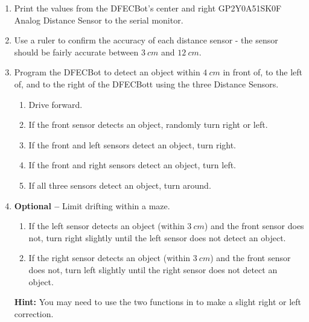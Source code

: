 \documentclass{handout}
\begin{document}
	\begin{enumerate}
		\item Print the values from the DFECBot's center and right GP2Y0A51SK0F Analog Distance Sensor to the serial monitor.
		\item Use a ruler to confirm the accuracy of each distance sensor - the sensor should be fairly accurate between $3\ cm$ and $12\ cm$.
		\item Program the DFECBot to detect  an object within $4\ cm$ in front of, to the left of, and to the right of the DFECBott using the three Distance Sensors.
			\begin{enumerate}
				\item Drive forward.
				\item If the front sensor detects an object, randomly turn right or left.
				\item If the front and left sensors detect an object, turn right.
				\item If the front and right sensors detect an object, turn left.
				\item If all three sensors detect an object, turn around.
			\end{enumerate}
				
			\item \textbf{Optional --} Limit drifting within a maze.
				
			\begin{enumerate}
				\item If the left sensor detects an object (within $3\ cm$) and the front sensor does not, turn right slightly until the left sensor does not detect an object.
				\item If the right sensor detects an object (within $3\ cm$) and the front sensor does not, turn left slightly until the right sensor does not detect an object.
			\end{enumerate}
			
			\textbf{Hint:} You may need to use the two functions in  to make a slight right or left correction.
	\end{enumerate} 	
\end{document}
